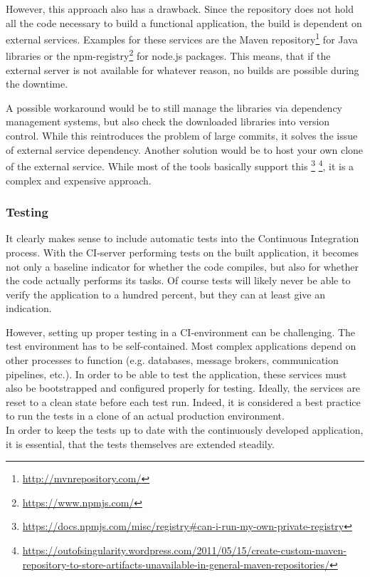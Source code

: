 However, this approach also has a drawback. Since the repository does not hold
all the code necessary to build a functional application, the build is dependent
on external services. Examples for these services are the Maven
repository\footnote{\url{http://mvnrepository.com/}} for Java libraries or the
npm-registry\footnote{\url{https://www.npmjs.com/}} for node.js packages. This
means, that if the external server is not available for whatever reason, no
builds are possible during the downtime.

A possible workaround would be to still manage the libraries via dependency
management systems, but also check the downloaded libraries into version
control. While this reintroduces the problem of large commits, it solves the
issue of external service dependency. Another solution would be to host your own
clone of the external service. While most of the tools basically support this
\footnote{\url{https://docs.npmjs.com/misc/registry\#can-i-run-my-own-private-registry}}
\footnote{\url{https://outofsingularity.wordpress.com/2011/05/15/create-custom-maven-repository-to-store-artifacts-unavailable-in-general-maven-repositories/}},
it is a complex and expensive approach.

\subsubsection{Testing}\label{sec:testing}

It clearly makes sense to include automatic tests into the Continuous
Integration process. With the CI-server performing tests on the built
application, it becomes not only a baseline indicator for whether the code
compiles, but also for whether the code actually performs its tasks. Of course
tests will likely never be able to verify the application to a hundred percent,
but they can at least give an indication.

However, setting up proper testing in a CI-environment can be challenging. The
test environment has to be self-contained. Most complex applications depend on
other processes to function (e.g. databases, message brokers, communication
pipelines, etc.). In order to be able to test the application, these services
must also be bootstrapped and configured properly for testing. Ideally, the
services are reset to a clean state before each test run. Indeed, it is
considered a best practice to run the tests in a clone of an actual production
environment.\\

In order to keep the tests up to date with the continuously developed
application, it is essential, that the tests themselves are extended steadily.

